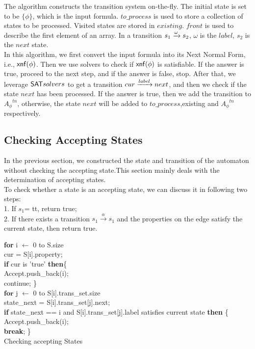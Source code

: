 The algorithm constructs the transition system on-the-fly. The initial state is set to be $\{\phi\}$, which is the input formula. $to\_process$ is used to store a collection of states to be processed. Visited states are stored in $existing$. $front$ is used to describe the first element of an array. In a transition $s_1\xrightarrow[]{\omega}s_2$, $\omega$ is the $label$, $s_2$ is the $next$ state. \\
In this algorithm, we first convert the input formula into its Next Normal Form, i.e., ${\sf xnf}(\phi)$. Then we use \SAT solvers to check if ${\sf xnf}(\phi)$ is satisfiable. If the answer is true, proceed to the next step, and if the answer is false, stop. After that, we leverage ${\sf SAT} solvers$ to get a transition $cur\xrightarrow[]{label}next$, and then we check if the state $next$ has been processed. If the answer is true, then we add the transition to ${A_{\phi}}^{tn}$, otherwise, the state $next$ will be added to  $to\_process$,existing and ${A_{\phi}}^{tn}$ respectively.


\subsection{Checking Accepting States}  
In the previous section, we constructed the state and transition of the automaton without checking the accepting state.This section mainly deals with the determination of accepting states. \\
To check whether a state is an accepting state, we can  discuss it in following two steps: \\
1. If $s_1 $= tt, return true; \\
2. If there exists a transition  $ s_1 \overset{\alpha}{\rightarrow}s_1$ and  the properties on the edge satisfy the current state, then return true. \\

\IncMargin{1em}
 \begin{algorithm}[H]
    \SetAlgoNoLine
    \BlankLine
\textbf{for} i $\leftarrow$  0 to S.size  \\
\qquad cur = S[i].property;  \\
\qquad  \textbf{if} cur is 'true'   \textbf{then}\{      \\
\qquad \quad Accept.push\_back(i);     \\
\qquad \quad  continue;  \}     \\
\qquad  $ \textbf{for}$ j $\leftarrow$  0 to S[i].trans\_set.size \\
\qquad \quad state\_next = S[i].trans\_set[j].next;  \\
\qquad \quad \textbf{if} state\_next == i and S[i].trans\_set[j].label satisfies current state \textbf{then} \{  \\
\qquad \qquad Accept.push\_back(i);  \\
\qquad \qquad \textbf{break}; \} \\
 \caption{Checking accepting States}
\end{algorithm}
